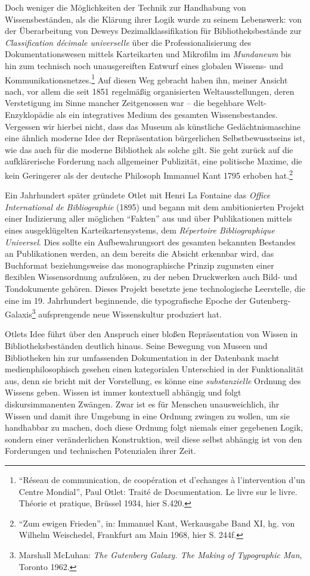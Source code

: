 Doch weniger die Möglichkeiten der Technik zur Handhabung von
Wissensbeständen, als die Klärung ihrer Logik wurde zu seinem
Lebenswerk: von der Überarbeitung von Deweys Dezimalklassifikation für
Bibliotheksbestände zur \emph{Classification décimale universelle} über
die Professionalisierung des Dokumentationswesen mittels Karteikarten
und Mikrofilm im \emph{Mundaneum} bis hin zum technisch noch
unausgereiften Entwurf eines globalen Wissens- und
Kommunikationsnetzes.\footnote{\enquote{Réseau de communication, de
  coopération et d'echanges à l'intervention d'un Centre Mondial}, Paul
  Otlet: Traité de Documentation. Le livre sur le livre. Théorie et
  pratique, Brüssel 1934, hier S.420.} Auf diesen Weg gebracht haben
ihn, meiner Ansicht nach, vor allem die seit 1851 regelmäßig
organisierten Weltausstellungen, deren Verstetigung im Sinne mancher
Zeitgenossen war -- die begehbare Welt-Enzyklopädie als ein integratives
Medium des gesamten Wissensbestandes. Vergessen wir hierbei nicht, dass
das Museum als künstliche Gedächtnismaschine eine ähnlich moderne Idee
der Repräsentation bürgerlichen Selbstbewusstseins ist, wie das auch für
die moderne Bibliothek als solche gilt. Sie geht zurück auf die
aufklärerische Forderung nach allgemeiner Publizität, eine politische
Maxime, die kein Geringerer als der deutsche Philosoph Immanuel Kant
1795 erhoben hat.\footnote{\enquote{Zum ewigen Frieden}, in: Immanuel
  Kant, Werkausgabe Band XI, hg. von Wilhelm Weischedel, Frankfurt am
  Main 1968, hier S. 244f.}

Ein Jahrhundert später gründete Otlet mit Henri La Fontaine das
\emph{Office International de Bibliographie} (1895) und begann mit dem
ambitionierten Projekt einer Indizierung aller möglichen
\enquote{Fakten} aus und über Publikationen mittels eines ausgeklügelten
Karteikartensystems, dem \emph{Répertoire Bibliographique Universel}.
Dies sollte ein Aufbewahrungsort des gesamten bekannten Bestandes an
Publikationen werden, an dem bereits die Absicht erkennbar wird, das
Buchformat beziehungsweise das monographische Prinzip zugunsten einer
flexiblen Wissensordnung aufzulösen, zu der neben Druckwerken auch Bild-
und Tondokumente gehören. Dieses Projekt besetzte jene technologische
Leerstelle, die eine im 19. Jahrhundert beginnende, die typografische
Epoche der Gutenberg-Galaxis\footnote{Marshall McLuhan: \emph{The
  Gutenberg Galaxy. The Making of Typographic Man}, Toronto 1962.}
aufsprengende neue Wissenskultur produziert hat.

Otlets Idee führt über den Anspruch einer bloßen Repräsentation von
Wissen in Bibliotheksbeständen deutlich hinaus. Seine Bewegung von
Museen und Bibliotheken hin zur umfassenden Dokumentation in der
Datenbank macht medienphilosophisch gesehen einen kategorialen
Unterschied in der Funktionalität aus, denn sie bricht mit der
Vorstellung, es könne eine \emph{substanzielle} Ordnung des Wissens
geben. Wissen ist immer kontextuell abhängig und folgt diskursimmanenten
Zwängen. Zwar ist es für Menschen unausweichlich, ihr Wissen und damit
ihre Umgebung in eine Ordnung zwingen zu wollen, um sie handhabbar zu
machen, doch diese Ordnung folgt niemals einer gegebenen Logik, sondern
einer veränderlichen Konstruktion, weil diese selbst abhängig ist von
den Forderungen und technischen Potenzialen ihrer Zeit.

